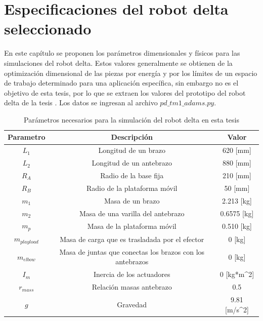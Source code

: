 \chapter{Especificaciones del robot delta seleccionado}\label{CAP5}
En este capítulo se proponen los parámetros dimensionales y físicos para las simulaciones del robot delta. Estos valores generalmente se obtienen de la optimización dimensional de las piezas por energía y por los límites de un espacio de trabajo determinado para una aplicación específica, sin embargo no es el objetivo de esta tesis, por lo que se extraen los valores del prototipo del robot delta de la tesis \cite{upm378}. Los datos se ingresan al archivo $pd\_tm1\_adams.py$.


    \begingroup
        \renewcommand{\arraystretch}{1.5}
        \begin{table}[H]
        \centering
        \begin{tabular}{c c{4cm} c}
           \hline
           \textbf{Parametro}  & \multicolumn{1}{c}{\textbf{Descripción}} & Valor \\\hline\hline
            $L_1$  & Longitud de un brazo           & 620 [mm]                        \\\hline
            $L_2$  & Longitud de un antebrazo       & 880 [mm]                         \\\hline
            $R_A$  & Radio de la base fija           & 210 [mm]                         \\\hline
            $R_B$  & Radio de la plataforma móvil    & 50 [mm]                         \\\hline
            $m_1$  & Masa de un brazo                & 2.213 [kg]                         \\\hline
            $m_2$  & Masa de una varilla del antebrazo  & 0.6575 [kg]                         \\\hline
            $m_p$  & Masa de la plataforma móvil     & 0.510 [kg]                         \\\hline
            $m_{playload}$  & Masa de carga que es trasladada por el efector & 0 [kg]           \\\hline
            $m_{elbow}$  & Masa de juntas que conectas los brazos con los antebrazos  & 0 [kg]  \\\hline
            $I_m$  & Inercia de los actuadores           &   0 [kg*m^2]     \\\hline
            $r_{mass}$  & Relación masas antebrazo           & 0.5        \\\hline
            $g$  & Gravedad           & 9.81  [m/s^2]                      \\\hline 
        \end{tabular}
        \caption{Parámetros necesarios para la simulación del robot delta en esta tesis}
        \label{tab:cap5_tabla_1}
    \end{table}
    \endgroup
    
